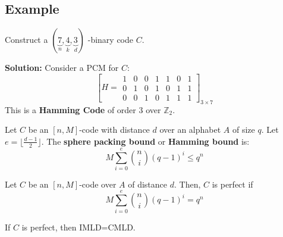 \begin{exbox}
    \subsection{Example}
    Construct a $ (\underbrace{7}_{n},\underbrace{4}_{k},\underbrace{3}_{d}) $
    -binary code $ C $.

    \textbf{Solution:}
    Consider a PCM for $ C $:
    \[ \left[ H=
    \begin{array}{ccc|cccc}
        1 & 0 & 0 & 1 & 1 & 0 & 1\\
        0 & 1 & 0 & 1 & 0 & 1 & 1\\
        0 & 0 & 1 & 0 & 1 & 1 & 1
    \end{array} \right]_{3\times 7} \]
    This is a \textbf{Hamming Code} of order $ 3 $ over $ \mathbb{Z}_2 $.
\end{exbox}

\begin{defbox}
    \begin{definition}
    Let $ C $ be an $ [n,M] $-code with distance $ d $ over an
    alphabet $ A $ of size $ q $. Let $ e=\lfloor \frac{d-1}{2} \rfloor $.
    The \textbf{sphere packing bound} or \textbf{Hamming bound} is:
    \[ M \sum\limits_{i=0}^{e} \binom{n}{i}(q-1)^i\leqslant q^n \]
\end{definition} \end{defbox}

\begin{defbox}
    \begin{definition}
    Let $ C $ be an $ [n,M] $-code over $ A $ of distance $ d $. Then, 
    $ C $ is perfect if
    \[ M \sum\limits_{i=0}^{e} \binom{n}{i}(q-1)^i = q^n \]
\end{definition} \end{defbox}

 If $ C $ is perfect, then IMLD=CMLD.